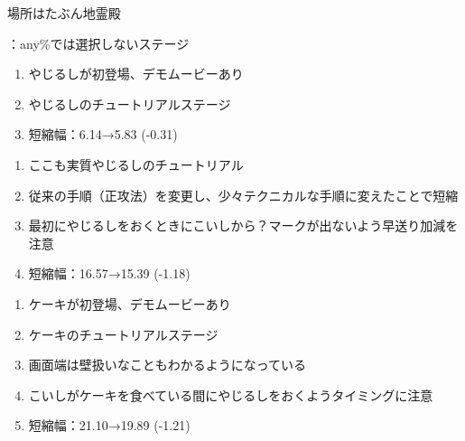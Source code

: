 

%





場所はたぶん地霊殿
\begin{marker}
{\TBW}：any\%では選択しないステージ
\end{marker}


\begin{enumerate}[label={\sarrow}]
\item やじるしが初登場、デモムービーあり
\item やじるしのチュートリアルステージ
\item 短縮幅：6.14→5.83 (-0.31)
\end{enumerate}



\begin{enumerate}[label={\sarrow}]
\item ここも実質やじるしのチュートリアル
\item 従来の手順（正攻法）を変更し、少々テクニカルな手順に変えたことで短縮
\item 最初にやじるしをおくときにこいしから？\hspace{0pt}マークが出ないよう早送り加減を注意
\item 短縮幅：16.57→15.39 (-1.18)
\end{enumerate}



\begin{enumerate}[label={\sarrow}]
\item ケーキが初登場、デモムービーあり
\item ケーキのチュートリアルステージ
\item 画面端は壁扱いなこともわかるようになっている
\item こいしがケーキを食べている間にやじるしをおくようタイミングに注意
\item 短縮幅：21.10→19.89 (-1.21)
\end{enumerate}



